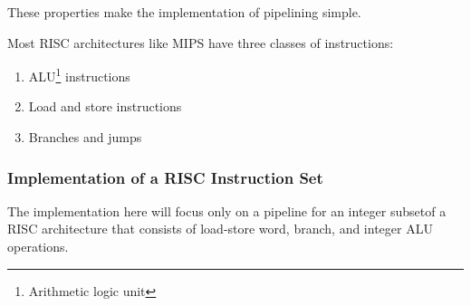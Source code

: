 \documentclass[12pt, a4paper]{article}
\theoremstyle{margin}
\begin{document}
	  These properties make the implementation of pipelining simple.

	  Most RISC architectures like MIPS have three classes of instructions:
	  \begin{enumerate}
		\item ALU\footnote{Arithmetic logic unit} instructions 
		\item Load and store instructions
		\item Branches and jumps
	  \end{enumerate}

	\subsubsection{Implementation of a RISC Instruction Set}

	  \indent

	  The implementation here will focus only on a pipeline for an integer subsetof a RISC architecture that consists of load-store word, branch, and integer ALU operations.
\end{document}
